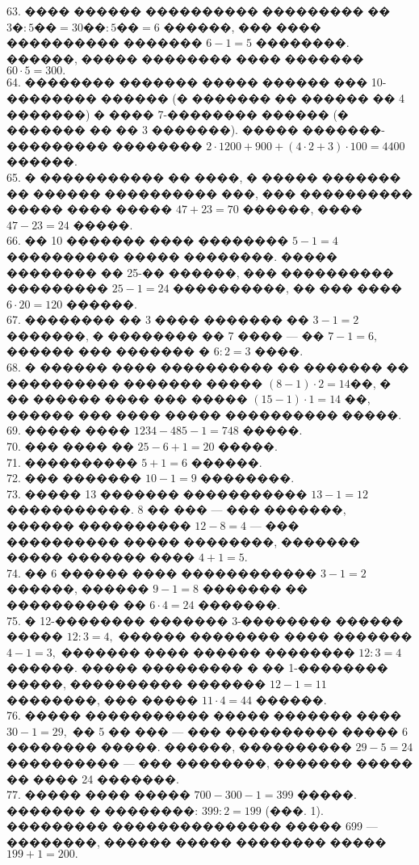 \documentclass[12pt]{article}
\begin{document}
63. ���� ������ ���������� ��������� �� $3\text{�}:5\text{��}=30\text{��}:5\text{��}=6$ ������, ��� ���� ���������� ������� $6-1=5$ ��������. ������, ����� �������� ���� ������� $60\cdot5=300.$\\
64. �������� ������� ����� ������ ��� 10-�������� ������ (� ������� �� ������ �� 4 �������) � ���� 7-�������� ������ (� ������� �� �� 3 �������). ����� �������-��������� �������� $2\cdot1200+900+(4\cdot2+3)\cdot100=4400$ ������.\\
65. � ����������� �� ����, � ����� ������� �� ������ ���������� ���, ��� ���������� ����� ���� ����� $47+23=70$ ������, ���� $47-23=24$ �����.\\
66. �� 10 ������� ���� �������� $5-1=4$ ���������� ����� ��������. ����� �������� �� 25-�� ������, ��� ���������� ��������� $25-1=24$ ����������, �� ��� ���� $6\cdot20=120$ ������.\\
67. �������� �� 3 ���� ������� �� $3-1=2$ �������, � �������� �� 7 ���� --- �� $7-1=6,$ ������ ��� ������� � $6:2=3$ ����.\\
68. � ������ ���� ���������� �� ������� �� ���������� ������� ����� $(8-1)\cdot2=14$��, � �� ������ ���� ��� ����� $(15-1)\cdot1=14$ ��, ������ ��� ���� ����� ���������� �����.\\
69. ����� ���� $1234-485-1=748$ �����.\\
70. ��� ���� �� $25-6+1=20$ �����.\\
71. ���������� $5+1=6$ ������.\\
72. ��� ������� $10-1=9$ ��������.\\
73. ����� 13 ������� ����������� $13-1=12$ �����������. 8 �� ��� --- ��� �������, ������ ���������� $12-8=4$ --- ��� ���������� ����� ��������, ������� ����� ������� ���� $4+1=5.$\\
74. �� 6 ������ ���� ������������ $3-1=2$ ������, ������ $9-1=8$ ������� �� ���������� �� $6\cdot4=24$ �������.\\
75. � 12-�������� ������� 3-�������� ������ ����� $12:3=4,$ ������ �������� ���� ������� $4-1=3,$ ������� ���� ������ �������� $12:3=4$ ������. ����� ��������� � �� 1-�������� �����, ���������� ������� $12-1=11$ ��������, ��� ����� $11\cdot4=44$ ������.\\
76. ����� ����������� ����� ������� ���� $30-1=29,$ �� 5 �� ��� --- ��� ���������� ����� 6 �������� �����. ������, ���������� $29-5=24$ ���������� --- ��� ��������, ������� ����� �� ���� 24 �������.\\
77. ����� ���� ����� $700-300-1=399$ �����. ������� � ��������: $399:2=199$ (���. 1). ��������� ��������������� ����� 699 --- ��������, ������ ����� �������� ����� $199+1=200.$\\
\end{document}
